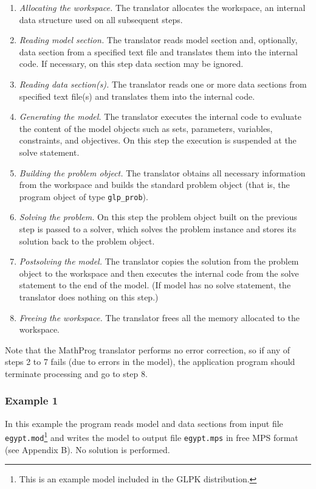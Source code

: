 \begin{enumerate}
\item{\it Allocating the workspace.}
The translator allocates the workspace, an internal data structure used
on all subsequent steps.
\item{\it Reading model section.} The translator reads model section
and, optionally, data section from a specified text file and translates
them into the internal code. If necessary, on this step data section
may be ignored.
\item{\it Reading data section(s).} The translator reads one or more
data sections from specified text file(s) and translates them into the
internal code.
\item{\it Generating the model.} The translator executes the internal
code to evaluate the content of the model objects such as sets,
parameters, variables, constraints, and objectives. On this step the
execution is suspended at the solve statement.
\item {\it Building the problem object.} The translator obtains all
necessary information from the workspace and builds the standard
problem object (that is, the program object of type \verb|glp_prob|).
\item{\it Solving the problem.} On this step the problem object built
on the previous step is passed to a solver, which solves the problem
instance and stores its solution back to the problem object.
\item{\it Postsolving the model.} The translator copies the solution
from the problem object to the workspace and then executes the internal
code from the solve statement to the end of the model. (If model has
no solve statement, the translator does nothing on this step.)
\item{\it Freeing the workspace.} The translator frees all the memory
allocated to the workspace.
\end{enumerate}

Note that the MathProg translator performs no error correction, so if
any of steps 2 to 7 fails (due to errors in the model), the application
program should terminate processing and go to step 8.

\subsubsection*{Example 1}

In this example the program reads model and data sections from input
file \verb|egypt.mod|\footnote{This is an example model included in
the GLPK distribution.} and writes the model to output file
\verb|egypt.mps| in free MPS format (see Appendix B). No solution is
performed.

